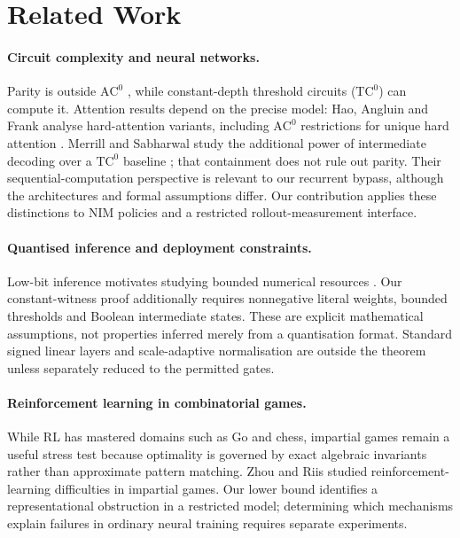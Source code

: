 \documentclass[11pt]{article}
\newcommand{\AC}{\mathrm{AC}}
\newcommand{\TC}{\mathrm{TC}}
\theoremstyle{plain}
\theoremstyle{definition}
\theoremstyle{remark}
\numberwithin{equation}{section}
\begin{document}
\section{Related Work}
\label{sec:related}

\paragraph{Circuit complexity and neural networks.}
Parity is outside $\AC^0$ \cite{furst1984parity,hastad1986thesis}, while constant-depth threshold circuits ($\TC^0$) can compute it.
Attention results depend on the precise model: Hao, Angluin and Frank analyse hard-attention variants, including $\AC^0$ restrictions for unique hard attention \cite{hao2022hardattention}. Merrill and Sabharwal study the additional power of intermediate decoding over a $\TC^0$ baseline \cite{merrill2021transformer}; that containment does not rule out parity. Their sequential-computation perspective is relevant to our recurrent bypass, although the architectures and formal assumptions differ.
Our contribution applies these distinctions to NIM policies and a restricted rollout-measurement interface.

\paragraph{Quantised inference and deployment constraints.}
Low-bit inference motivates studying bounded numerical resources \cite{jacob2018integeronly,dettmers2022llmint8}. Our constant-witness proof additionally requires nonnegative literal weights, bounded thresholds and Boolean intermediate states. These are explicit mathematical assumptions, not properties inferred merely from a quantisation format. Standard signed linear layers and scale-adaptive normalisation are outside the theorem unless separately reduced to the permitted gates.

\paragraph{Reinforcement learning in combinatorial games.}
While RL has mastered domains such as Go and chess, impartial games remain a useful stress test because optimality is governed by exact algebraic invariants rather than approximate pattern matching.
Zhou and Riis \cite{zhou2022impartial,zhou2023parity} studied reinforcement-learning difficulties in impartial games.
Our lower bound identifies a representational obstruction in a restricted model; determining which mechanisms explain failures in ordinary neural training requires separate experiments.
\end{document}

